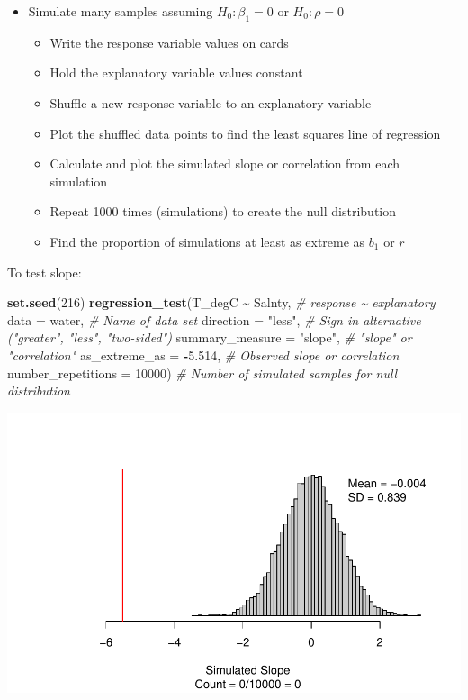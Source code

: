 \documentclass[
]{report}
\newenvironment{Shaded}{\begin{snugshade}}{\end{snugshade}}
\newcommand{\AttributeTok}[1]{\textcolor[rgb]{0.13,0.29,0.53}{#1}}
\newcommand{\CommentTok}[1]{\textcolor[rgb]{0.56,0.35,0.01}{\textit{#1}}}
\newcommand{\DecValTok}[1]{\textcolor[rgb]{0.00,0.00,0.81}{#1}}
\newcommand{\FloatTok}[1]{\textcolor[rgb]{0.00,0.00,0.81}{#1}}
\newcommand{\FunctionTok}[1]{\textcolor[rgb]{0.13,0.29,0.53}{\textbf{#1}}}
\newcommand{\NormalTok}[1]{#1}
\newcommand{\SpecialCharTok}[1]{\textcolor[rgb]{0.81,0.36,0.00}{\textbf{#1}}}
\newcommand{\StringTok}[1]{\textcolor[rgb]{0.31,0.60,0.02}{#1}}
\begin{document}
\begin{itemize}
\item
  Simulate many samples assuming \(H_0: \beta_1 = 0\) or \(H_0: \rho =0\)

  \begin{itemize}
  \item
    Write the response variable values on cards
  \item
    Hold the explanatory variable values constant
  \item
    Shuffle a new response variable to an explanatory variable
  \item
    Plot the shuffled data points to find the least squares line of regression
  \item
    Calculate and plot the simulated slope or correlation from each simulation
  \item
    Repeat 1000 times (simulations) to create the null distribution
  \item
    Find the proportion of simulations at least as extreme as \(b_1\) or \(r\)
  \end{itemize}
\end{itemize}

To test slope:

\begin{Shaded}
\begin{Highlighting}[]
\FunctionTok{set.seed}\NormalTok{(}\DecValTok{216}\NormalTok{)}
\FunctionTok{regression\_test}\NormalTok{(T\_degC }\SpecialCharTok{\textasciitilde{}}\NormalTok{ Salnty, }\CommentTok{\# response \textasciitilde{} explanatory}
               \AttributeTok{data =}\NormalTok{ water, }\CommentTok{\# Name of data set}
               \AttributeTok{direction =} \StringTok{"less"}\NormalTok{, }\CommentTok{\# Sign in alternative ("greater", "less", "two{-}sided")}
               \AttributeTok{summary\_measure =} \StringTok{"slope"}\NormalTok{, }\CommentTok{\# "slope" or "correlation"}
               \AttributeTok{as\_extreme\_as =} \SpecialCharTok{{-}}\FloatTok{5.514}\NormalTok{, }\CommentTok{\# Observed slope or correlation}
               \AttributeTok{number\_repetitions =} \DecValTok{10000}\NormalTok{) }\CommentTok{\# Number of simulated samples for null distribution}
\end{Highlighting}
\end{Shaded}

\begin{center}\includegraphics[width=0.7\linewidth]{13-VN13-regression_files/figure-latex/unnamed-chunk-13-1} \end{center}
\end{document}
